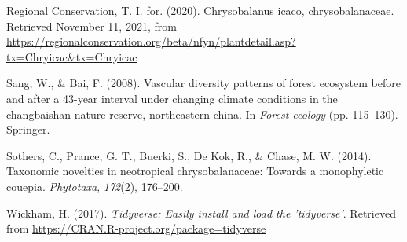 \documentclass[11pt,]{article}
\begin{document}
\hypertarget{ref-ircCicaco}{}
Regional Conservation, T. I. for. (2020). Chrysobalanus icaco,
chrysobalanaceae. Retrieved November 11, 2021, from
\url{https://regionalconservation.org/beta/nfyn/plantdetail.asp?tx=Chryicac\&tx=Chryicac}

\hypertarget{ref-sang2008vascular}{}
Sang, W., \& Bai, F. (2008). Vascular diversity patterns of forest
ecosystem before and after a 43-year interval under changing climate
conditions in the changbaishan nature reserve, northeastern china. In
\emph{Forest ecology} (pp. 115--130). Springer.

\hypertarget{ref-sothers2014taxonomic}{}
Sothers, C., Prance, G. T., Buerki, S., De Kok, R., \& Chase, M. W.
(2014). Taxonomic novelties in neotropical chrysobalanaceae: Towards a
monophyletic couepia. \emph{Phytotaxa}, \emph{172}(2), 176--200.

\hypertarget{ref-tidyverseR}{}
Wickham, H. (2017). \emph{Tidyverse: Easily install and load the
'tidyverse'}. Retrieved from
\url{https://CRAN.R-project.org/package=tidyverse}




\newpage
\singlespacing 
\end{document}
